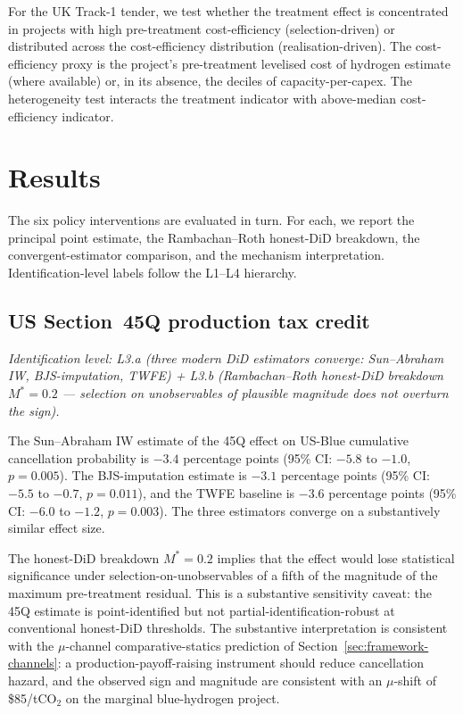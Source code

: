\documentclass[12pt,a4paper]{article}
\theoremstyle{plain}
\theoremstyle{definition}
\begin{document}
For the UK Track-1 tender, we test whether the treatment effect is concentrated in projects with high pre-treatment cost-efficiency (selection-driven) or distributed across the cost-efficiency distribution (realisation-driven). The cost-efficiency proxy is the project's pre-treatment levelised cost of hydrogen estimate (where available) or, in its absence, the deciles of capacity-per-capex. The heterogeneity test interacts the treatment indicator with above-median cost-efficiency indicator.

\section{Results}
\label{sec:results}

The six policy interventions are evaluated in turn. For each, we report the principal point estimate, the Rambachan--Roth honest-DiD breakdown, the convergent-estimator comparison, and the mechanism interpretation. Identification-level labels follow the L1--L4 hierarchy.

\subsection{US Section~45Q production tax credit}
\label{sec:results-45q}

\noindent\emph{Identification level: L3.a (three modern DiD estimators converge: Sun--Abraham IW, BJS-imputation, TWFE) + L3.b (Rambachan--Roth honest-DiD breakdown $M^{*} = 0.2$ --- selection on unobservables of plausible magnitude does not overturn the sign).}

The Sun--Abraham IW estimate of the 45Q effect on US-Blue cumulative cancellation probability is $-3.4$ percentage points (95\% CI: $-5.8$ to $-1.0$, $p = 0.005$). The BJS-imputation estimate is $-3.1$ percentage points (95\% CI: $-5.5$ to $-0.7$, $p = 0.011$), and the TWFE baseline is $-3.6$ percentage points (95\% CI: $-6.0$ to $-1.2$, $p = 0.003$). The three estimators converge on a substantively similar effect size.

The honest-DiD breakdown $M^{*} = 0.2$ implies that the effect would lose statistical significance under selection-on-unobservables of a fifth of the magnitude of the maximum pre-treatment residual. This is a substantive sensitivity caveat: the 45Q estimate is point-identified but not partial-identification-robust at conventional honest-DiD thresholds. The substantive interpretation is consistent with the $\mu$-channel comparative-statics prediction of Section~\ref{sec:framework-channels}: a production-payoff-raising instrument should reduce cancellation hazard, and the observed sign and magnitude are consistent with an $\mu$-shift of \$85/tCO$_2$ on the marginal blue-hydrogen project.
\end{document}
